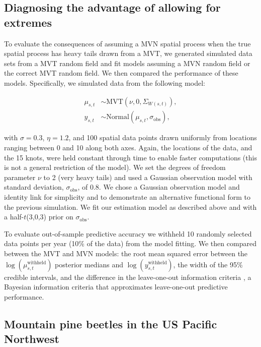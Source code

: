 \documentclass[12pt,english]{article}
\begin{document}
\begin{spacing}{1.3}
\subsection{Diagnosing the advantage of allowing for extremes}

To evaluate the consequences of assuming a MVN spatial process when the
true spatial process has heavy tails drawn from a MVT, we generated simulated
data sets from a MVT random field and fit models assuming a
MVN random field or the
correct MVT random field.
We then compared the performance of these models. Specifically, we
simulated data from the following model:

\begin{align}
  \mu_{s,t} &\sim \mathrm{MVT}\left(\nu, 0, \Sigma_{W(s,t)}\right),\\
  y_{s,t} &\sim \mathrm{Normal} \left(\mu_{s,t}, \sigma_{\mathrm{obs}} \right),
\end{align}

\noindent with $\sigma = 0.3$, $\eta = 1.2$, and 100 spatial data points drawn uniformly
from locations ranging between 0 and 10 along both axes. Again, the locations
of the data, and the 15 knots, were held constant through time to enable faster
computations (this is not a general restriction of the model).
We set the degrees of freedom parameter $\nu$ to 2 (very heavy tails) and used a
Gaussian observation model with standard deviation, $\sigma_{\mathrm{obs}}$, of
0.8. We chose a Gaussian observation
model and identity link for simplicity and to demonstrate an alternative
functional form to the previous simulation. We fit our estimation model as
described above and with a half-$t$(3,0,3) prior on $\sigma_{\mathrm{obs}}$.

To evaluate out-of-sample predictive accuracy we withheld
10 randomly selected data points
per year (10\% of the data) from the model fitting.
We then compared between the MVT and MVN models:
the root mean squared error
between the $\log(\mu^{\mathrm{withheld}}_{s,t})$
posterior medians and $\log\left(y^{\mathrm{withheld}}_{s,t}\right)$,
the width of the 95\% credible intervals,
and the difference in the leave-one-out information criteria
\citep[LOOIC;][]{vehtari2016},
a Bayesian information criteria that approximates
leave-one-out predictive performance.

\subsection{Mountain pine beetles in the US Pacific Northwest}


\end{spacing}
\end{document}
